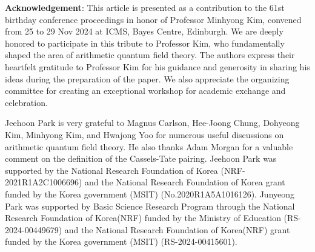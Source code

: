 \documentclass[a4paper]{amsart}
\theoremstyle{definition}
\numberwithin{equation}{section}
\begin{document}
\textbf{Acknowledgement}:
This article is presented as a contribution to the 61st birthday conference proceedings in honor of Professor Minhyong Kim, convened from 25 to 29 Nov 2024 at ICMS, Bayes Centre, Edinburgh. We are deeply honored to participate in this tribute to Professor Kim, who fundamentally shaped the area of arithmetic quantum field theory. The authors express their heartfelt gratitude to Professor Kim for his guidance and generosity in sharing his ideas during the preparation of the paper.
We also appreciate the organizing committee for creating an exceptional workshop for academic exchange and celebration.


Jeehoon Park is very grateful to Magnus Carlson, Hee-Joong Chung, Dohyeong Kim, Minhyong Kim, and Hwajong Yoo for numerous useful discussions on arithmetic quantum field theory. He also thanks Adam Morgan for a valuable comment on the definition of the Cassels-Tate pairing.
Jeehoon Park was supported by the National Research Foundation of Korea (NRF-2021R1A2C1006696) and the National Research Foundation of Korea grant funded by the Korea government (MSIT) (No.2020R1A5A1016126). 
Junyeong Park was supported by Basic Science Research Program through the
National Research Foundation of Korea(NRF) funded by the Ministry of Education (RS-2024-00449679) and the National Research Foundation of Korea(NRF) grant funded by the Korea government (MSIT) (RS-2024-00415601).
\end{document}
